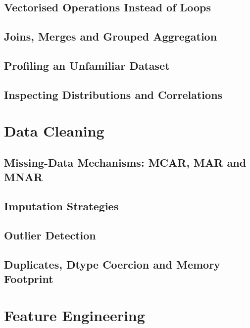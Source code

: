 \subsection{Vectorised Operations Instead of Loops}

\subsection{Joins, Merges and Grouped Aggregation}

\subsection{Profiling an Unfamiliar Dataset}

\subsection{Inspecting Distributions and Correlations}

\section{Data Cleaning}
\label{sec:data-cleaning}

\subsection{Missing-Data Mechanisms: MCAR, MAR and MNAR}

\subsection{Imputation Strategies}

\subsection{Outlier Detection}

\subsection{Duplicates, Dtype Coercion and Memory Footprint}

\section{Feature Engineering}
\label{sec:feature-engineering}

